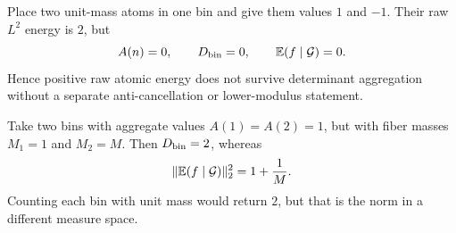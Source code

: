 \begin{example}
\label{ex:ce-bin-cancellation}
Place two unit-mass atoms in one bin and give them values \(1\) and
\(-1\).  Their raw \(L^2\) energy is \(2\), but
\[
 A(n)=0,\qquad D_{\rm bin}=0,\qquad
 \mathbb E(f\mid\mathcal G)=0.
\]
Hence positive raw atomic energy does not survive determinant
aggregation without a separate anti-cancellation or lower-modulus
statement.
\end{example}

\begin{example}
Take two bins with aggregate values \(A(1)=A(2)=1\), but with fiber
masses \(M_1=1\) and \(M_2=M\).  Then \(D_{\rm bin}=2\), whereas
\[
 \|\mathbb E(f\mid\mathcal G)\|_2^2=1+\frac1M.
\]
Counting each bin with unit mass would return \(2\), but that is the
norm in a different measure space.
\end{example}
